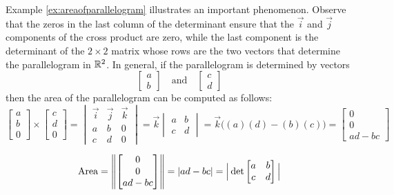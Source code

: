 \documentclass{ximera}
\begin{document}
\begin{general}
Example \ref{ex:areaofparallelogram} illustrates an important phenomenon.  Observe that the zeros in the last column of the determinant ensure that the $\vec{i}$ and $\vec{j}$ components of the cross product are zero, while the last component is the determinant of the $2\times 2$ matrix whose rows are the two vectors that determine the parallelogram in $\mathbb{R}^2$.  In general, if the parallelogram is determined by vectors 
$$\begin{bmatrix}a\\b\end{bmatrix}\quad\text{and}\quad\begin{bmatrix}c\\d\end{bmatrix}$$
then the area of the parallelogram can be computed as follows:
$$\begin{bmatrix}a\\b\\0\end{bmatrix}\times\begin{bmatrix}c\\d\\0\end{bmatrix}=\begin{vmatrix}\vec{i}&\vec{j}&\vec{k}\\a&b&0\\c&d&0\end{vmatrix}=\vec{k}\begin{vmatrix}a&b\\c&d\end{vmatrix}=\vec{k}\Big((a)(d)-(b)(c)\Big)=\begin{bmatrix}0\\0\\ad-bc\end{bmatrix}$$

$$\mbox{Area}=\left\lVert\begin{bmatrix}0\\0\\ad-bc\end{bmatrix}\right\rVert=|ad-bc|=\Big|\det\begin{bmatrix}a&b\\c&d\end{bmatrix}\Big|$$


\end{general}
\end{document}
